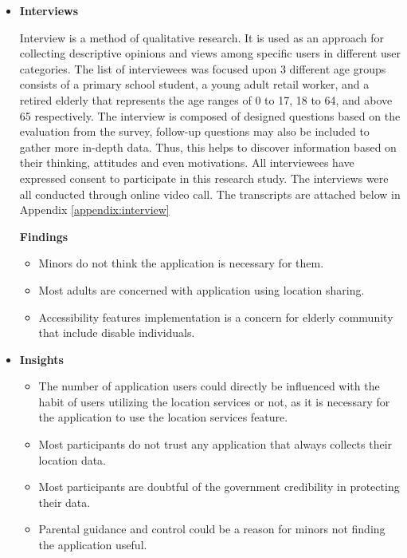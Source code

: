 \begin{enumerate}[a)]
\begin{itemize}
            \item \textbf{Interviews}
              \par Interview is a method of qualitative research. It is used as an approach for collecting descriptive
              opinions and views among specific users in different user categories. The list of interviewees was
              focused upon 3 different age groups consists of a primary school student, a young adult retail worker,
              and a retired elderly that represents the age ranges of 0 to 17, 18 to 64, and above 65 respectively.
              The interview is composed of designed questions based on the evaluation from the survey, follow-up
              questions may also be included to gather more in-depth data. Thus, this helps to discover information
              based on their thinking, attitudes and even motivations. All interviewees have expressed consent to
              participate in this research study. The interviews were all conducted through online video call. The
              transcripts are attached below in Appendix \ref{appendix:interview}
              \par \textbf{Findings}
                \begin{itemize}
                  \item Minors do not think the application is necessary for them.
                  \item Most adults are concerned with application using location sharing.
                  \item Accessibility features implementation is a concern for elderly community that include disable individuals.
                \end{itemize}
            \item \textbf{Insights}
              \begin{itemize}
                \item The number of application users could directly be influenced with the habit of users utilizing the location services or not, as it is necessary for the application to use the location services feature.
                \item Most participants do not trust any application that always collects their location data.
                \item Most participants are doubtful of the government credibility in protecting their data.
                \item Parental guidance and control could be a reason for minors not finding the application useful.

\end{itemize}
\end{itemize}
\end{enumerate}
